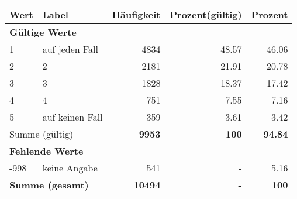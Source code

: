      \begin{longtable}{lXrrr}
     \toprule
     \textbf{Wert} & \textbf{Label} & \textbf{Häufigkeit} & \textbf{Prozent(gültig)} & \textbf{Prozent} \\
     \endhead
     \midrule
     \multicolumn{5}{l}{\textbf{Gültige Werte}}\\

     1 &
     \multicolumn{1}{X}{ auf jeden Fall   } &


       \num{4834} &
       \num[round-mode=places,round-precision=2]{48,57} &
         \num[round-mode=places,round-precision=2]{46,06} \\

     2 &
     \multicolumn{1}{X}{ 2   } &


       \num{2181} &
       \num[round-mode=places,round-precision=2]{21,91} &
         \num[round-mode=places,round-precision=2]{20,78} \\

     3 &
     \multicolumn{1}{X}{ 3   } &


       \num{1828} &
       \num[round-mode=places,round-precision=2]{18,37} &
         \num[round-mode=places,round-precision=2]{17,42} \\

     4 &
     \multicolumn{1}{X}{ 4   } &


       \num{751} &
       \num[round-mode=places,round-precision=2]{7,55} &
         \num[round-mode=places,round-precision=2]{7,16} \\

     5 &
     \multicolumn{1}{X}{ auf keinen Fall   } &


       \num{359} &
       \num[round-mode=places,round-precision=2]{3,61} &
         \num[round-mode=places,round-precision=2]{3,42} \\
     \midrule
     \multicolumn{2}{l}{Summe (gültig)} &
       \textbf{\num{9953}} &
     \textbf{100} &
       \textbf{\num[round-mode=places,round-precision=2]{94,84}} \\
     \multicolumn{5}{l}{\textbf{Fehlende Werte}}\\
       -998 &
       keine Angabe &
         \num{541} &
        - &
         \num[round-mode=places,round-precision=2]{5,16} \\
     \midrule
     \multicolumn{2}{l}{\textbf{Summe (gesamt)}} &
          \textbf{\num{10494}} &
        \textbf{-} &
        \textbf{100} \\
     \bottomrule
     \end{longtable}
     
